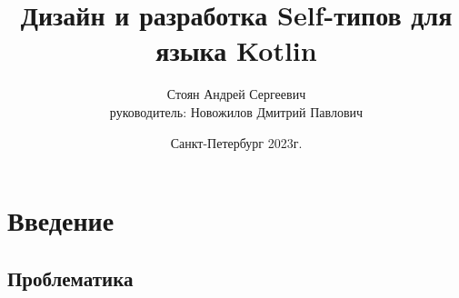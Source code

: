 \documentclass[handout,aspectratio=169,usenames,dvipsnames]{beamer}
\author[Андрей Стоян]{Стоян Андрей Сергеевич\\ {\footnotesize руководитель:} Новожилов Дмитрий Павлович}
\institute[ИТМО/SE]{Университет ИТМО\\Разработка программного обеспечения/Software engineering}
\title[Дизайн и разработка Self-типов для языка Kotlin]{Дизайн и разработка Self-типов для языка Kotlin}
\date{Санкт-Петербург 2023г.}
\begin{document}
    \maketitle



    \section{Введение}

    \subsection{Проблематика}
\end{document}

